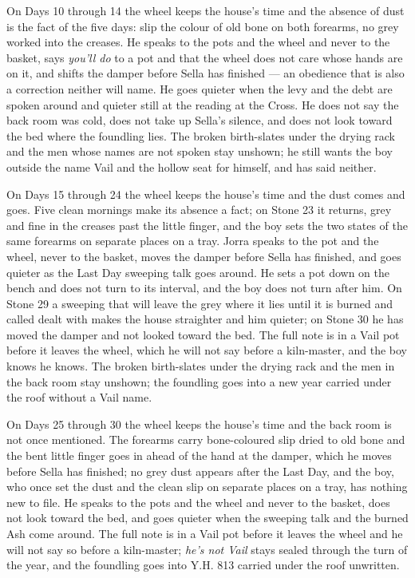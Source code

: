 \documentclass{design/chronicle}
\begin{document}
{On Days 10 through 14 the wheel keeps the house’s time and the absence of dust is the fact of the five days: slip the colour of old bone on both forearms, no grey worked into the creases. He speaks to the pots and the wheel and never to the basket, says \emph{you’ll do} to a pot and that the wheel does not care whose hands are on it, and shifts the damper before Sella has finished --- an obedience that is also a correction neither will name. He goes quieter when the levy and the debt are spoken around and quieter still at the reading at the Cross. He does not say the back room was cold, does not take up Sella’s silence, and does not look toward the bed where the foundling lies. The broken birth-slates under the drying rack and the men whose names are not spoken stay unshown; he still wants the boy outside the name Vail and the hollow seat for himself, and has said neither.

On Days 15 through 24 the wheel keeps the house’s time and the dust comes and goes. Five clean mornings make its absence a fact; on Stone 23 it returns, grey and fine in the creases past the little finger, and the boy sets the two states of the same forearms on separate places on a tray. Jorra speaks to the pot and the wheel, never to the basket, moves the damper before Sella has finished, and goes quieter as the Last Day sweeping talk goes around. He sets a pot down on the bench and does not turn to its interval, and the boy does not turn after him. On Stone 29 a sweeping that will leave the grey where it lies until it is burned and called dealt with makes the house straighter and him quieter; on Stone 30 he has moved the damper and not looked toward the bed. The full note is in a Vail pot before it leaves the wheel, which he will not say before a kiln-master, and the boy knows he knows. The broken birth-slates under the drying rack and the men in the back room stay unshown; the foundling goes into a new year carried under the roof without a Vail name.

On Days 25 through 30 the wheel keeps the house’s time and the back room is not once mentioned. The forearms carry bone-coloured slip dried to old bone and the bent little finger goes in ahead of the hand at the damper, which he moves before Sella has finished; no grey dust appears after the Last Day, and the boy, who once set the dust and the clean slip on separate places on a tray, has nothing new to file. He speaks to the pots and the wheel and never to the basket, does not look toward the bed, and goes quieter when the sweeping talk and the burned Ash come around. The full note is in a Vail pot before it leaves the wheel and he will not say so before a kiln-master; \emph{he’s not Vail} stays sealed through the turn of the year, and the foundling goes into Y.H. 813 carried under the roof unwritten.

}
\end{document}

